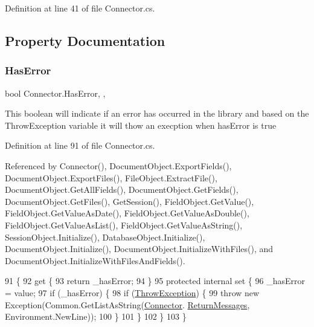 Definition at line 41 of file Connector.\+cs.



\subsection{Property Documentation}
\mbox{\label{class_connector_a9365777a6b7b711b75bcfa6c4d53e989}} 
\subsubsection{\texorpdfstring{Has\+Error}{HasError}}
{\footnotesize\ttfamily bool Connector.\+Has\+Error\hspace{0.3cm}{\ttfamily [static]}, {\ttfamily [get]}, {\ttfamily [set]}}



This boolean will indicate if an error has occurred in the library and based on the Throw\+Exception variable it will thow an execption when has\+Error is true 



Definition at line 91 of file Connector.\+cs.



Referenced by Connector(), Document\+Object.\+Export\+Fields(), Document\+Object.\+Export\+Files(), File\+Object.\+Extract\+File(), Document\+Object.\+Get\+All\+Fields(), Document\+Object.\+Get\+Fields(), Document\+Object.\+Get\+Files(), Get\+Session(), Field\+Object.\+Get\+Value(), Field\+Object.\+Get\+Value\+As\+Date(), Field\+Object.\+Get\+Value\+As\+Double(), Field\+Object.\+Get\+Value\+As\+List(), Field\+Object.\+Get\+Value\+As\+String(), Session\+Object.\+Initialize(), Database\+Object.\+Initialize(), Document\+Object.\+Initialize(), Document\+Object.\+Initialize\+With\+Files(), and Document\+Object.\+Initialize\+With\+Files\+And\+Fields().


\begin{DoxyCode}
91                                 \{
92         \textcolor{keyword}{get} \{
93             \textcolor{keywordflow}{return} \_hasError;
94         \}
95         \textcolor{keyword}{protected} \textcolor{keyword}{internal} \textcolor{keyword}{set} \{
96             \_hasError = value;
97             \textcolor{keywordflow}{if} (\_hasError) \{
98                 \textcolor{keywordflow}{if} (\mbox{\hyperlink{class_connector_a8ec0dcdbb4a85a56fa50f67686484c19}{ThrowException}}) \{
99                     \textcolor{keywordflow}{throw} \textcolor{keyword}{new} Exception(Common.GetListAsString(\mbox{\hyperlink{class_connector}{Connector}}.
      \mbox{\hyperlink{class_connector_a1ed422674b344524fd77998dcf6a9ba6}{ReturnMessages}}, Environment.NewLine));
100                 \}
101             \}
102         \}
103     \}
\end{DoxyCode}
\mbox{\label{class_connector_a7e4bd5a6b59b228b169066b5f5ed4b0a}} 
